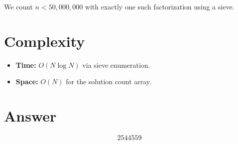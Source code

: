 \documentclass[12pt]{article}
\begin{document}
We count $n < 50{,}000{,}000$ with exactly one such factorization using a sieve.

\section{Complexity}
\begin{itemize}
\item \textbf{Time:} $O(N \log N)$ via sieve enumeration.
\item \textbf{Space:} $O(N)$ for the solution count array.
\end{itemize}

\section{Answer}

\[
\boxed{2544559}
\]
\end{document}
